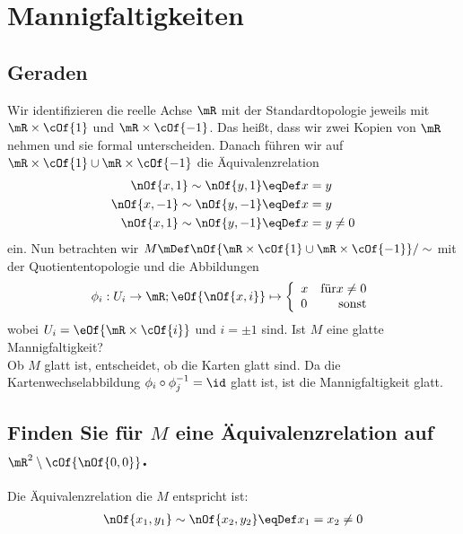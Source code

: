 \section{Mannigfaltigkeiten}
\subsection{Geraden}
Wir identifizieren die reelle Achse $\mR$ mit der Standardtopologie jeweils mit $\mR\times\cOf{1}$ und $\mR\times\cOf{-1}$. Das heißt, dass wir zwei Kopien von $\mR$ nehmen und sie formal unterscheiden. Danach führen wir auf $\mR\times\cOf{1}\cup\mR\times\cOf{-1}$ die Äquivalenzrelation
\begin{align}
	\nOf{x,1}\sim\nOf{y,1}&\eqDef x = y \\
	\nOf{x,-1}\sim\nOf{y,-1}&\eqDef x = y \\
	\nOf{x,1}\sim\nOf{y,-1}&\eqDef x = y \neq 0
\end{align}
ein. Nun betrachten wir $M\mDef\nOf{\mR\times\cOf{1}\cup\mR\times\cOf{-1}}/\sim$ mit der Quotiententopologie und die Abbildungen
\begin{equation}
	\phi_i : U_i \to \mR; \eOf{\nOf{x,i}} \mapsto \left\{\begin{array}{l r}x & \text{für} x \neq 0\\0&\text{sonst}\end{array}\right.
\end{equation}
wobei $U_i = \eOf{\mR\times\cOf{i}}$ und $i = \pm 1$ sind. Ist $M$ eine glatte Mannigfaltigkeit?\\
Ob $M$ glatt ist, entscheidet, ob die Karten glatt sind. Da die Kartenwechselabbildung $\phi_i\circ\phi_j^{-1} = \id$ glatt ist, ist die Mannigfaltigkeit glatt.

\subsection{Finden Sie für $M$ eine Äquivalenzrelation auf $\mR^2\setminus\cOf{\nOf{0,0}}$.} Die Äquivalenzrelation die $M$ entspricht ist:
\begin{align}
	\nOf{x_1,y_1}\sim\nOf{x_2,y_2}&\eqDef x_1 = x_2 \neq 0\\
\end{align}



